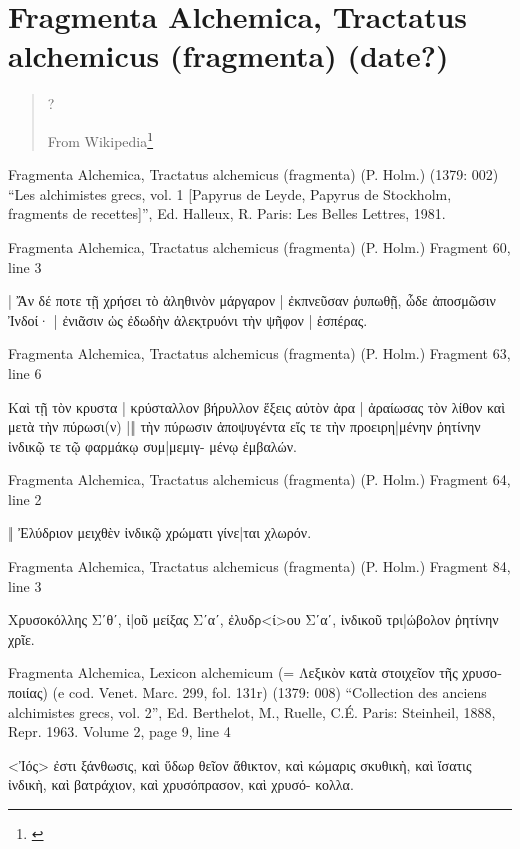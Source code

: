 \documentclass[12pt,letterpaper,twoside,final]{memoir}
\begin{document}
\section{Fragmenta Alchemica, Tractatus alchemicus (fragmenta) (date?)}
\blockquote[From Wikipedia\footnote{\url{}}]{?}
\begin{greek}

Fragmenta Alchemica, Tractatus alchemicus (fragmenta) (P. Holm.) (1379: 002)
“Les alchimistes grecs, vol. 1 [Papyrus de Leyde, Papyrus de Stockholm, fragments de recettes]”, Ed. Halleux, R.
Paris: Les Belles Lettres, 1981.

Fragmenta Alchemica, Tractatus alchemicus (fragmenta) (P. Holm.) 
Fragment 60, line 3

                       | 
 Ἄν δέ ποτε τῇ χρήσει τὸ ἀληθινὸν μάργαρον | ἐκπνεῦσαν 
ῥυπωθῇ, ὧδε ἀποσμῶσιν Ἰνδοί· | ἐνιᾶσιν ὡς ἐδωδὴν 
ἀλεκ̣τρυόνι τὴν ψῆφον | ἑσπέρας. 



Fragmenta Alchemica, Tractatus alchemicus (fragmenta) (P. Holm.) 
Fragment 63, line 6

        Καὶ τῇ τὸν {κρυστα} | κρύσταλλον βήρυλλον 
ἕξεις αὐτὸν {ἀρα} | ἀραίωσας τὸν λίθον καὶ μετὰ τὴν 
πύρωσι(ν) |‖ {τὴν πύρωσιν} ἀποψυγέντα εἴς τε τὴν 
προειρη|μένην ῥητίνην ἰνδικῷ τε τῷ φαρμάκῳ συμ|μεμιγ-
μένῳ ἐμβαλών. 



Fragmenta Alchemica, Tractatus alchemicus (fragmenta) (P. Holm.) 
Fragment 64, line 2

                          ‖ 
 Ἐλύδριον μειχθὲν ἰνδικῷ χρώματι γίνε|ται χλωρόν. 



Fragmenta Alchemica, Tractatus alchemicus (fragmenta) (P. Holm.) 
Fragment 84, line 3

                       Χρυσοκόλλης Σʹθʹ, ἰ|οῦ μείξας Σʹαʹ, 
ἐλυδρ<ί>ου Σʹαʹ, ἰνδικοῦ τρι|ώβολον ῥητίνην χρῖε. 



Fragmenta Alchemica, Lexicon alchemicum (= Λεξικὸν κατὰ στοιχεῖον τῆς χρυσοποιίας) (e cod. Venet. Marc. 299, fol. 131r) (1379: 008)
“Collection des anciens alchimistes grecs, vol. 2”, Ed. Berthelot, M., Ruelle, C.É.
Paris: Steinheil, 1888, Repr. 1963.
Volume 2, page 9, line 4

<Ἰός> ἐστι ξάνθωσις, καὶ ὕδωρ θεῖον ἄθικτον, καὶ κώμαρις σκυθικὴ, 
 καὶ ἴσατις ἰνδικὴ, καὶ βατράχιον, καὶ χρυσόπρασον, καὶ χρυσό-
 κολλα. 




\end{greek}
\end{document}
